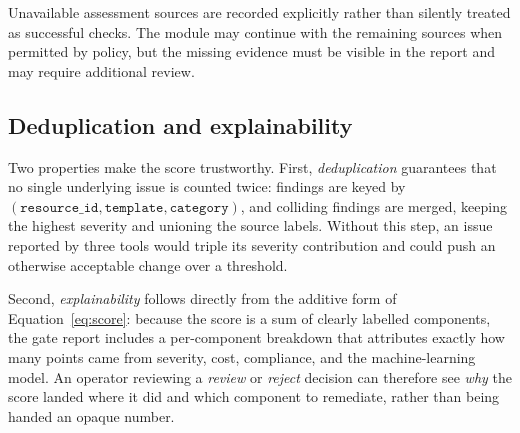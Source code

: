 Unavailable assessment sources are recorded explicitly rather than silently treated as
successful checks. The module may continue with the remaining sources when permitted by
policy, but the missing evidence must be visible in the report and may require additional review.

\subsection{Deduplication and explainability}
\label{subsec:rs-explain}

Two properties make the score trustworthy. First, \emph{deduplication} guarantees that no
single underlying issue is counted twice: findings are keyed by
$(\texttt{resource\_id}, \texttt{template}, \texttt{category})$, and colliding findings
are merged, keeping the highest severity and unioning the source labels. Without this
step, an issue reported by three tools would triple its severity contribution and could
push an otherwise acceptable change over a threshold.

Second, \emph{explainability} follows directly from the additive form of
Equation~\ref{eq:score}: because the score is a sum of clearly labelled components, the
gate report includes a per-component breakdown that attributes exactly how many points
came from severity, cost, compliance, and the machine-learning model. An operator
reviewing a \emph{review} or \emph{reject} decision can therefore see \emph{why} the
score landed where it did and which component to remediate, rather than being handed an
opaque number.
